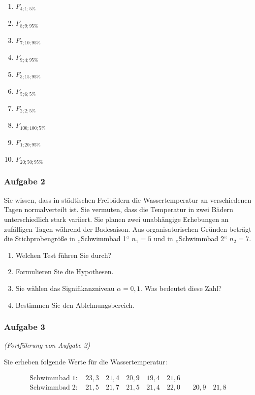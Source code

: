 \documentclass[
  ngerman,
]{article}
\providecommand{\tightlist}{%
  \setlength{\itemsep}{0pt}\setlength{\parskip}{0pt}}
\begin{document}
\begin{enumerate}
\def\labelenumi{\alph{enumi})}
\tightlist
\item
  \(F_{4;1;5\%}\)
\item
  \(F_{8;9;95\%}\)
\item
  \(F_{7;10;95\%}\)
\item
  \(F_{9;4;95\%}\)
\item
  \(F_{3;15;95\%}\)
\item
  \(F_{5;6;5\%}\)
\item
  \(F_{2;2;5\%}\)
\item
  \(F_{100;100;5\%}\)
\item
  \(F_{1;20;95\%}\)
\item
  \(F_{20;50;95\%}\)
\end{enumerate}

\hypertarget{aufgabe-2-5}{%
\subsubsection{Aufgabe 2}\label{aufgabe-2-5}}

Sie wissen, dass in städtischen Freibädern die Wassertemperatur an verschiedenen Tagen normalverteilt ist. Sie vermuten, dass die Temperatur in zwei Bädern unterschiedlich stark variiert. Sie planen zwei unabhängige Erhebungen an zufälligen Tagen während der Badesaison. Aus organisatorischen Gründen beträgt die Stichprobengröße in „Schwimmbad 1`` \(n_1=5\) und in „Schwimmbad 2`` \(n_2=7\).

\begin{enumerate}
\def\labelenumi{\alph{enumi})}
\tightlist
\item
  Welchen Test führen Sie durch?
\item
  Formulieren Sie die Hypothesen.
\item
  Sie wählen das Signifikanzniveau \(\alpha=0{,}1\). Was bedeutet diese Zahl?
\item
  Bestimmen Sie den Ablehnungsbereich.
\end{enumerate}

\hypertarget{aufgabe-3-3}{%
\subsubsection{Aufgabe 3}\label{aufgabe-3-3}}

\emph{(Fortführung von Aufgabe 2)}

Sie erheben folgende Werte für die Wassertemperatur:

\[\begin{aligned}
\textrm{Schwimmbad 1}:\quad 23{,}3\quad21{,}4\quad20{,}9\quad19{,}4\quad21{,}6&\\
\textrm{Schwimmbad 2} : \quad 21{,}5\quad21{,}7\quad21{,}5\quad21{,}4\quad22{,}0&\quad20{,}9\quad21{,}8
\end{aligned}\]
\end{document}
